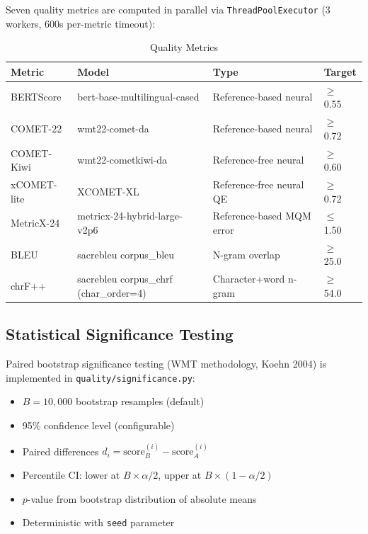\documentclass[11pt,a4paper,twoside]{article}
\begin{document}
Seven quality metrics are computed in parallel via \texttt{ThreadPoolExecutor}
(3 workers, 600s per-metric timeout):

\begin{table}[H]
\centering
\caption{Quality Metrics}
\label{tab:metrics}
\begin{tabular}{lllp{3cm}}
\toprule
\textbf{Metric} & \textbf{Model} & \textbf{Type} & \textbf{Target} \\
\midrule
BERTScore & bert-base-multilingual-cased & Reference-based neural & $\geq$ 0.55 \\
COMET-22 & wmt22-comet-da & Reference-based neural & $\geq$ 0.72 \\
COMET-Kiwi & wmt22-cometkiwi-da & Reference-free neural & $\geq$ 0.60 \\
xCOMET-lite & XCOMET-XL & Reference-free neural QE & $\geq$ 0.72 \\
MetricX-24 & metricx-24-hybrid-large-v2p6 & Reference-based MQM error & $\leq$ 1.50 \\
BLEU & sacrebleu corpus\_bleu & N-gram overlap & $\geq$ 25.0 \\
chrF++ & sacrebleu corpus\_chrf (char\_order=4) & Character+word n-gram & $\geq$ 54.0 \\
\bottomrule
\end{tabular}
\end{table}

\subsection{Statistical Significance Testing}

Paired bootstrap significance testing (WMT methodology, Koehn 2004) is implemented
in \texttt{quality/significance.py}:

\begin{itemize}[nosep]
  \item $B = 10{,}000$ bootstrap resamples (default)
  \item 95\% confidence level (configurable)
  \item Paired differences $d_i = \text{score}_B^{(i)} - \text{score}_A^{(i)}$
  \item Percentile CI: lower at $B \times \alpha/2$, upper at $B \times (1-\alpha/2)$
  \item $p$-value from bootstrap distribution of absolute means
  \item Deterministic with \texttt{seed} parameter
\end{itemize}
\end{document}
